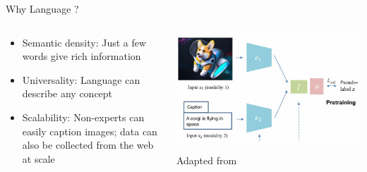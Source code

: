 \documentclass[serif, aspectratio=169]{beamer}
\begin{document}
\begin{frame}{Why Language ?}
    \begin{columns}
        \begin{column}{0.5\textwidth}
            \begin{itemize}
          \item      Semantic density: Just a few 
words give rich information
 \item  Universality: Language 
can describe any concept
\item  Scalability: Non-experts 
can easily caption images;
 data can also be collected 
from the web at scale
 
            \end{itemize}
        \end{column}
        \begin{column}{0.5\textwidth}
            \includegraphics[width=\textwidth]{pic/MultiModal-1.jpg} \\
            \begin{center}
            {\scriptsize Adapted from} %
            \end{center}
        \end{column}
    \end{columns}
\end{frame}
\end{document}
